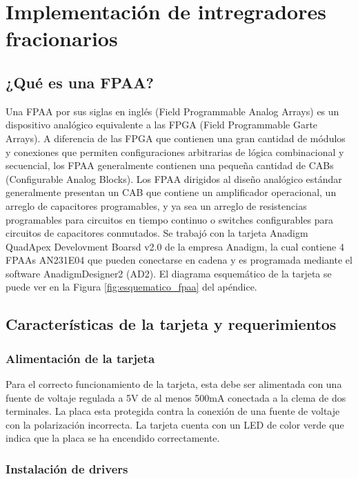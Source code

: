 \chapter{Implementación de intregradores fracionarios}

	\section{¿Qué es una FPAA?}
	Una FPAA  por sus siglas en inglés (Field Programmable Analog Arrays) es un dispositivo analógico equivalente a las FPGA (Field Programmable Garte Arrays). A diferencia de las FPGA que contienen una gran cantidad de módulos y conexiones que permiten configuraciones arbitrarias de lógica combinacional y secuencial, los FPAA generalmente contienen una pequeña cantidad de CABs (Configurable Analog Blocks). Los FPAA dirigidos al diseño analógico estándar generalmente presentan un CAB que contiene un amplificador operacional, un arreglo de capacitores programables, y ya sea un arreglo de resistencias programables para circuitos en tiempo continuo o switches configurables para circuitos de capacitores conmutados.
	Se trabajó con la tarjeta Anadigm QuadApex Develovment Boarsd v2.0 de la empresa Anadigm, la cual contiene 4 FPAAs AN231E04 que pueden conectarse en cadena y es programada mediante el software AnadigmDesigner2 (AD2). El diagrama esquemático de la tarjeta se puede ver en la Figura \ref{fig:esquematico_fpaa} del apéndice.
	
	\section{Características de la tarjeta y requerimientos}
	
		\subsection{Alimentación de la tarjeta}
	Para el correcto funcionamiento de la tarjeta, esta debe ser alimentada con una fuente de voltaje regulada a 5V de al menos 500mA conectada a la clema de dos terminales. La placa esta protegida contra la conexión de una fuente de voltaje con la polarización incorrecta. La tarjeta cuenta con un LED de color verde que indica que la placa se ha encendido correctamente. 
	
		\subsection{Instalación de drivers}

